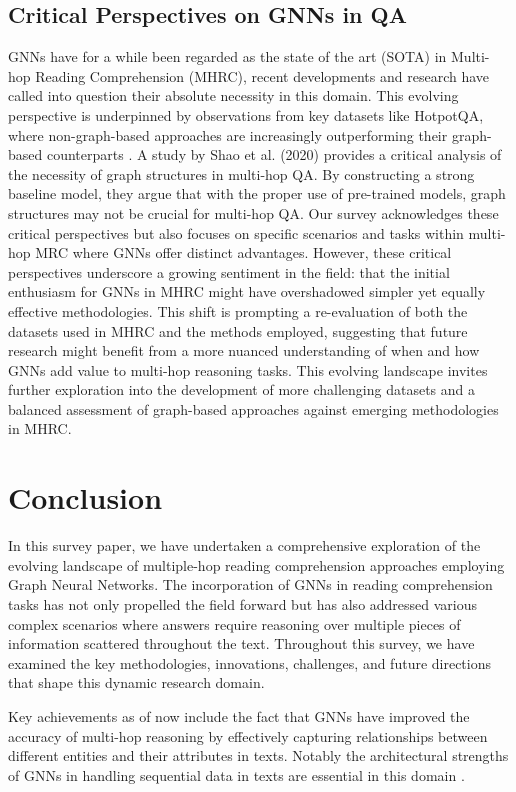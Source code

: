 \documentclass[sigplan,screen,nonacm]{acmart}
\begin{document}
\subsection{Critical Perspectives on GNNs in QA}
GNNs have for a while been regarded as the state of the art (SOTA) in Multi-hop Reading Comprehension (MHRC), recent developments and research 
have called into question their absolute necessity in this domain. This evolving perspective is underpinned by observations from key datasets like HotpotQA, where non-graph-based 
approaches are increasingly outperforming their graph-based counterparts \cite{RN105, RN149}. A study by Shao et al. (2020) \cite{RN127} provides a critical analysis of the necessity of graph structures in multi-hop QA. By constructing a strong baseline model, 
they argue that with the proper use of pre-trained models, graph structures may not be crucial for multi-hop QA. Our survey 
acknowledges these critical perspectives but also focuses on specific scenarios and tasks within multi-hop MRC where GNNs offer distinct advantages. However, these critical perspectives underscore a growing sentiment in the field: that the initial enthusiasm 
for GNNs in MHRC might have overshadowed simpler yet equally effective methodologies. This shift is prompting a re-evaluation of both the datasets used in MHRC and the methods employed, suggesting that future research might benefit 
from a more nuanced understanding of when and how GNNs add value to multi-hop reasoning tasks. This evolving landscape invites further exploration into the development of more challenging datasets and a balanced assessment of graph-based approaches against emerging methodologies in MHRC.


\section{Conclusion}
In this survey paper, we have undertaken a comprehensive exploration of the evolving landscape of multiple-hop reading comprehension approaches
employing Graph Neural Networks. The incorporation of GNNs in reading comprehension tasks has not only propelled the field forward but has 
also addressed various complex scenarios where answers require reasoning over multiple pieces of information scattered throughout the text. 
Throughout this survey, we have examined the key methodologies, innovations, challenges, and future directions that shape this dynamic research domain.

Key achievements as of now include the fact that GNNs have improved the accuracy of multi-hop reasoning by effectively capturing 
relationships between different entities and their attributes in texts. Notably the architectural strengths of GNNs in handling sequential 
data in texts are essential in this domain \cite{RN23}. 
\end{document}
